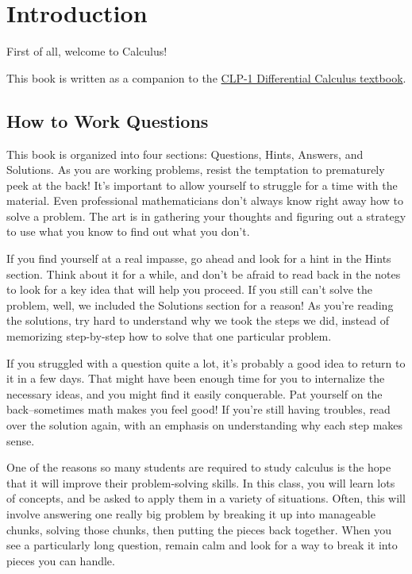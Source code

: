%
%
\section*{Introduction}
First of all, welcome to Calculus!

This book is written as a companion to the \href{https://www.math.ubc.ca/~CLP/CLP1/}{CLP-1 Differential Calculus textbook}.

\subsection*{How to Work Questions}

This book is organized into four sections: Questions, Hints, Answers, and Solutions. As you are working problems, resist the temptation to prematurely peek at the back! It's important to allow yourself to struggle for a time with the material. Even professional mathematicians don't always know right away how to solve a problem. The art is in gathering your thoughts and figuring out a strategy to use what you know to find out what you don't.

If you find yourself at a real impasse, go ahead and look for a hint in the Hints section. Think about it for a while, and don't be afraid to read back in the notes to look for a key idea that will help you proceed. If you still can't solve the problem, well, we included the Solutions section for a reason! As you're reading the solutions, try hard to understand why we took the steps we did, instead of memorizing step-by-step how to solve that one particular problem.

If you struggled with a question quite a lot, it's probably a good idea to return to it in a few days. That might have been enough time for you to internalize the necessary ideas, and you might find it easily conquerable. Pat yourself on the back--sometimes math makes you feel good! If you're still having troubles, read over the solution again, with an emphasis on understanding why each step makes sense.

One of the reasons so many students are required to study calculus is the hope that it will improve their problem-solving skills. In this class, you will learn lots of concepts, and be asked to apply them in a variety of situations. Often, this will involve answering one really big problem by breaking it up into manageable chunks, solving those chunks, then putting the pieces back together. When you see a particularly long question, remain calm and look for a way to break it into pieces you can handle.

